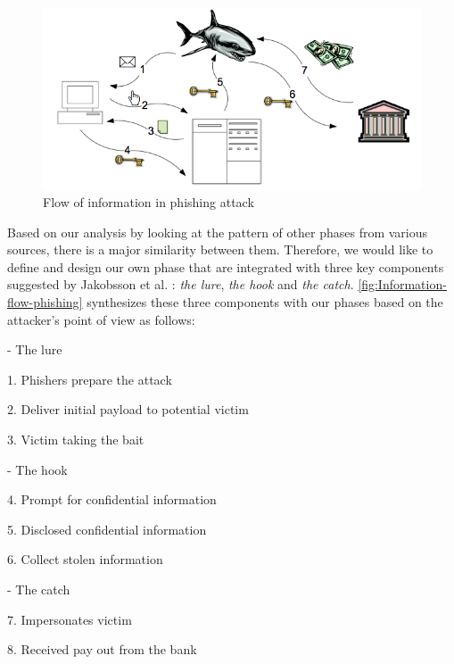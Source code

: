 \begin{figure}
\begin{centering}
\includegraphics[scale=0.4]{gfx/emigh}\protect\caption{\label{fig:emigh}Flow of information in phishing attack \citep{emigh:2005}}

\par\end{centering}

\end{figure}


Based on our analysis by looking at the pattern of other phases from
various sources, there is a major similarity between them. Therefore,
we would like to define and design our own phase that are integrated
with three key components suggested by Jakobsson et al. \citep{jakobsson:2006}:
\textit{the lure},\textit{ the hook} and \textit{the catch}. \autoref{fig:Information-flow-phishing}
synthesizes these three components with our phases based on the attacker's
point of view as follows:

- The lure 

1. Phishers prepare the attack 

2. Deliver initial payload to potential victim 

3. Victim taking the bait

- The hook 

4. Prompt for confidential information

5. Disclosed confidential information 

6. Collect stolen information 

- The catch

7. Impersonates victim 

8. Received pay out from the bank 

